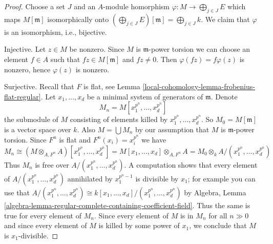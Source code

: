\begin{proof}
Choose a set $J$ and an $A$-module homorphism
$\varphi : M \to \bigoplus_{j \in J} E$ which maps
$M[\mathfrak m]$ isomorphically onto
$(\bigoplus_{j \in J} E)[\mathfrak m] = \bigoplus_{j \in J} k$.
We claim that $\varphi$ is an isomorphism, i.e., bijective.

\medskip\noindent
Injective. Let $z \in M$ be nonzero. Since $M$ is $\mathfrak m$-power torsion
we can choose an element $f \in A$ such that $fz \in M[\mathfrak m]$ and
$fz \not = 0$. Then $\varphi(fz) = f\varphi(z)$ is nonzero, hence
$\varphi(z)$ is nonzero.

\medskip\noindent
Surjective. Recall that $F$ is flat, see
Lemma \ref{local-cohomology-lemma-frobenius-flat-regular}.
Let $x_1, \ldots, x_d$ be a minimal system of generators of
$\mathfrak m$. Denote
$$
M_n = M[x_1^{p^n}, \ldots, x_d^{p^n}]
$$
the submodule of $M$ consisting of elements killed by
$x_1^{p^n}, \ldots, x_d^{p^n}$. So $M_0 = M[\mathfrak m]$
is a vector space over $k$. Also $M = \bigcup M_n$ by our
assumption that $M$ is $\mathfrak m$-power torsion. Since $F^n$ is flat and
$F^n(x_i) = x_i^{p^n}$ we have
$$
M_n \cong (M \otimes_{A, F^n} A)[x_1^{p^n}, \ldots, x_d^{p^n}] =
M[x_1, \ldots, x_d] \otimes_{A, F^n} A =
M_0 \otimes_k A/(x_1^{p^n}, \ldots, x_d^{p^n})
$$
Thus $M_n$ is free over $A/(x_1^{p^n}, \ldots, x_d^{p^n})$.
A computation shows that every element of $A/(x_1^{p^n}, \ldots, x_d^{p^n})$
annihilated by $x_1^{p^n - 1}$ is divisible by $x_1$; for example
you can use that $A/(x_1^{p^n}, \ldots, x_d^{p^n}) \cong
k[x_1, \ldots, x_d]/(x_1^{p^n}, \ldots, x_d^{p^n})$ by Algebra, Lemma
\ref{algebra-lemma-regular-complete-containing-coefficient-field}.
Thus the same is true for every element of $M_n$.
Since every element of $M$ is in $M_n$ for all $n \gg 0$
and since every element of $M$ is killed by some power of
$x_1$, we conclude that $M$ is $x_1$-divisible.


\end{proof}
